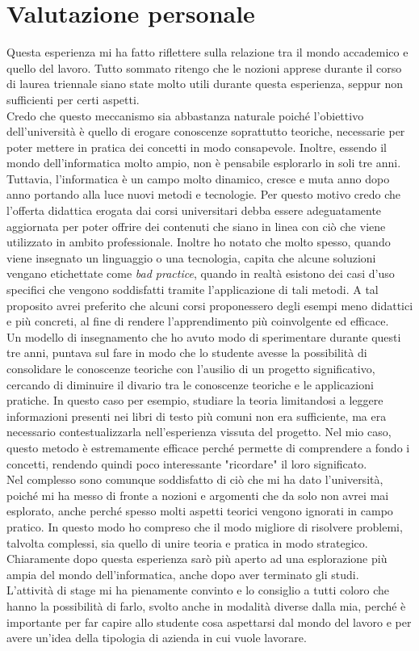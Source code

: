 \section{Valutazione personale}
Questa esperienza mi ha fatto riflettere sulla relazione tra il mondo accademico e quello del lavoro. Tutto sommato ritengo che le nozioni apprese durante il corso di laurea triennale siano state molto utili durante questa esperienza, seppur non sufficienti per certi aspetti. \\
Credo che questo meccanismo sia abbastanza naturale poiché l'obiettivo dell'università è quello di erogare conoscenze soprattutto teoriche, necessarie per poter mettere in pratica dei concetti in modo consapevole. Inoltre, essendo il mondo dell'informatica molto ampio, non è pensabile esplorarlo in soli tre anni. \\
Tuttavia, l'informatica è un campo molto dinamico, cresce e muta anno dopo anno portando alla luce nuovi metodi e tecnologie. Per questo motivo credo che l'offerta didattica erogata dai corsi universitari debba essere adeguatamente aggiornata per poter offrire dei contenuti che siano in linea con ciò che viene utilizzato in ambito professionale. Inoltre ho notato che molto spesso, quando viene insegnato un linguaggio o una tecnologia, capita che alcune soluzioni vengano etichettate come \textit{bad practice}, quando in realtà esistono dei casi d'uso specifici che vengono soddisfatti tramite l'applicazione di tali metodi. A tal proposito avrei preferito che alcuni corsi proponessero degli esempi meno didattici e più concreti, al fine di rendere l'apprendimento più coinvolgente ed efficace. \\
Un modello di insegnamento che ho avuto modo di sperimentare durante questi tre anni, puntava sul fare in modo che lo studente avesse la possibilità di consolidare le conoscenze teoriche con l'ausilio di un progetto significativo, cercando di diminuire il divario tra le conoscenze teoriche e le applicazioni pratiche. In questo caso per esempio, studiare la teoria limitandosi a leggere informazioni presenti nei libri di testo più comuni non era sufficiente, ma era necessario contestualizzarla nell'esperienza vissuta del progetto. Nel mio caso, questo metodo è estremamente efficace perché permette di comprendere a fondo i concetti, rendendo quindi poco interessante "ricordare" il loro significato. \\
Nel complesso sono comunque soddisfatto di ciò che mi ha dato l'università, poiché mi ha messo di fronte a nozioni e argomenti che da solo non avrei mai esplorato, anche perché spesso molti aspetti teorici vengono ignorati in campo pratico. In questo modo ho compreso che il modo migliore di risolvere problemi, talvolta complessi, sia quello di unire teoria e pratica in modo strategico. Chiaramente dopo questa esperienza sarò più aperto ad una esplorazione più ampia del mondo dell'informatica, anche dopo aver terminato gli studi. \\
L'attività di stage mi ha pienamente convinto e lo consiglio a tutti coloro che hanno la possibilità di farlo, svolto anche in modalità diverse dalla mia, perché è importante per far capire allo studente cosa aspettarsi dal mondo del lavoro e per avere un'idea della tipologia di azienda in cui vuole lavorare.
